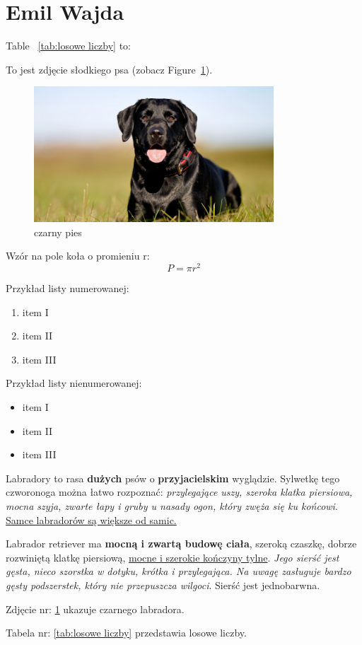 \section{Emil Wajda}

Table ~\ref{tab:losowe liczby} to:


\vspace{2 cm}

To jest zdjęcie słodkiego psa (zobacz Figure~\ref{fig:labrador}).
\begin{figure}[htbp]
    \centering
    \includegraphics[width=0.8\textwidth]{pictures/labrador.png}
    \caption{czarny pies}
    \label{fig:labrador}
\end{figure}

Wzór na pole koła o promieniu r: $$P= \pi r^2$$

Przykład listy numerowanej:
\begin{enumerate}
    \item item I
    \item item II
    \item item III
\end{enumerate}

Przykład listy nienumerowanej:
\begin{itemize}
    \item item I
    \item item II
    \item item III
\end{itemize}

\begin{center}
Labradory to rasa \textbf{dużych} psów o \textbf{przyjacielskim} wyglądzie. Sylwetkę tego czworonoga można łatwo rozpoznać: \textit{przylegające uszy, szeroka klatka piersiowa, mocna szyja, zwarte łapy i gruby u nasady ogon, który zwęża się ku końcowi}. \underline{Samce labradorów są większe od samic.}
\end{center}

\begin{flushleft}
    Labrador retriever ma \textbf{mocną i zwartą budowę ciała}, szeroką czaszkę, dobrze rozwiniętą klatkę piersiową, \underline{mocne i szerokie kończyny tylne}. \textit{Jego sierść jest gęsta, nieco szorstka w dotyku, krótka i przylegająca. Na uwagę zasługuje bardzo gęsty podszerstek, który nie przepuszcza wilgoci}. Sierść jest jednobarwna.
\end{flushleft}

Zdjęcie nr: \ref{fig:labrador} ukazuje czarnego labradora.\par
Tabela nr: \ref{tab:losowe liczby} przedstawia losowe liczby.
